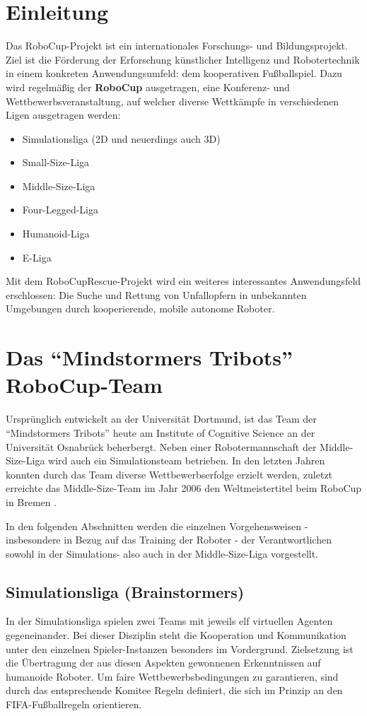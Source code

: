 \section{Einleitung}
Das RoboCup-Projekt ist ein internationales Forschungs- und Bildungsprojekt. 
Ziel ist die Förderung der Erforschung künstlicher Intelligenz und 
Robotertechnik in einem konkreten Anwendungsumfeld: dem kooperativen 
Fußballspiel.
Dazu wird regelmäßig der \textbf{RoboCup} ausgetragen, eine Konferenz- und
Wettbewerbsveranstaltung, auf welcher diverse Wettkämpfe in verschiedenen Ligen
ausgetragen werden:

\begin{itemize}
  \item Simulationsliga (2D und neuerdings auch 3D)
  \item Small-Size-Liga
  \item Middle-Size-Liga
  \item Four-Legged-Liga
  \item Humanoid-Liga
  \item E-Liga
\end{itemize}

Mit dem RoboCupRescue-Projekt wird ein weiteres interessantes
Anwendungsfeld erschlossen: Die Suche und Rettung von Unfallopfern in unbekannten
Umgebungen durch kooperierende, mobile autonome Roboter.

\section{Das "`Mindstormers Tribots"' RoboCup-Team}
Ursprünglich entwickelt an der Universität Dortmund, ist das Team der 
"`Mindstormers Tribots"' heute am Institute of Cognitive Science an der 
Universität Osnabrück beherbergt. Neben einer Robotermannschaft der 
Middle-Size-Liga wird auch ein Simulationsteam betrieben. In den letzten Jahren 
konnten durch das Team diverse Wettbewerbserfolge erzielt werden, zuletzt 
erreichte das Middle-Size-Team im Jahr 2006 den Weltmeistertitel beim RoboCup 
in Bremen \cite{url:Neuroinformatics2006}.

In den folgenden Abschnitten werden die einzelnen Vorgehensweisen - 
insbesondere in Bezug auf das Training der Roboter - der Verantwortlichen 
sowohl in der Simulations- also auch in der Middle-Size-Liga vorgestellt.

\subsection{Simulationsliga (Brainstormers)}
In der Simulationsliga spielen zwei Teams mit jeweils elf virtuellen Agenten 
gegeneinander. Bei dieser Disziplin steht die Kooperation und Kommunikation 
unter den einzelnen Spieler-Instanzen besonders im Vordergrund. Zielsetzung ist 
die Übertragung der aus diesen Aspekten gewonnenen Erkenntnissen auf humanoide 
Roboter.
Um faire Wettbewerbsbedingungen zu garantieren, sind durch das entsprechende 
Komitee Regeln definiert, die sich im Prinzip an den FIFA-Fußballregeln 
orientieren.

